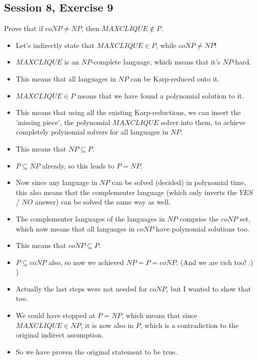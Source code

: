 \subsection {Session 8, Exercise 9}
\label{8_9}


Prove that if $coNP \neq{} NP$, then $MAXCLIQUE \notin{} P$.


\begin{itemize}
    \item Let's indirectly state that $MAXCLIQUE \in{} P$, while $coNP \neq{} NP$!
    \item $MAXCLIQUE$ is an $NP$-complete language, which means that it's $NP$-hard.
    \item This means that all languages in $NP$ can be Karp-reduced onto it.
    \item $MAXCLIQUE \in{} P$ means that we have found a polynomial solution to it.
    \item This means that using all the existing Karp-reductions, we can insert the 'missing piece', the polynomial $MAXCLIQUE$ solver into them, to achieve completely polynomial solvers for all languages in $NP$.
    \item This means that $NP\subseteq{}P$.
    \item $P\subseteq{}NP$ already, so this leads to $P = NP$.
    \item Now since any language in $NP$ can be solved (decided) in polynomial time, this also means that the complementer language (which only inverts the $YES$ / $NO$ answer) can be solved the same way as well.
    \item The complementer languages of the languages in $NP$ comprise the $coNP$ set, which now means that all languages in $coNP$ have polynomial solutions too.
    \item This means that $coNP \subseteq{} P$.
    \item $P\subseteq{}coNP$ also, so now we achieved $NP = P= coNP$. (And we are rich too! :) )
    \item Actually the last steps were not needed for $coNP$, but I wanted to show that too.
    \item We could have stopped at $P = NP$, which means that since $MAXCLIQUE \in{} NP$, it is now also in $P$, which is a contradiction to the original indirect assumption.
    \item So we have proven the original statement to be true.
\end{itemize}
